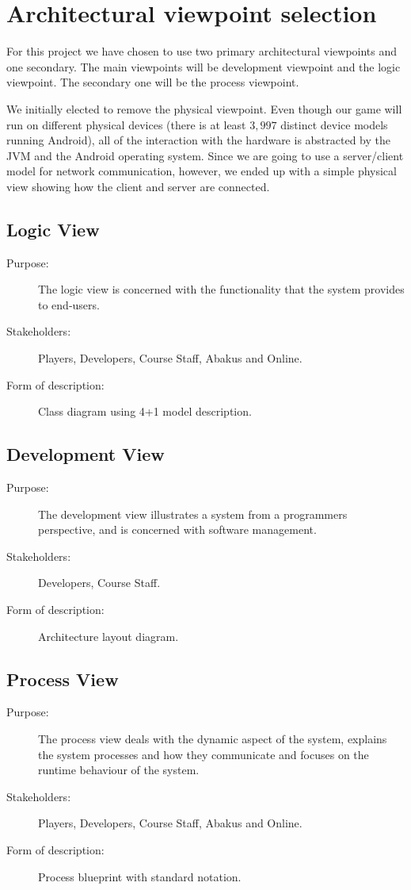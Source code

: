 \section{Architectural viewpoint selection}
\label{architecturalviewpointselection}
For this project we have chosen to use two primary architectural viewpoints and
one secondary. The main viewpoints will be development viewpoint and the logic
viewpoint. The secondary one will be the process viewpoint.

We initially elected to remove the physical viewpoint. Even though our game
will run on different physical devices (there is at least $3,997$ distinct
device models running Android\cite{website:androidfrag}), all of the
interaction with the hardware is abstracted by the JVM and the Android
operating system. Since we are going to use a server/client model for network
communication, however, we ended up with a simple physical view showing how
the client and server are connected.

\subsection{Logic View}
\begin{description}
	\item[Purpose:]{The logic view is concerned with the functionality that the
    system provides to end-users.}
	\item[Stakeholders:]{Players, Developers, Course Staff, Abakus and
    Online.}
	\item[Form of description:]{Class diagram using 4+1 model description.}
\end{description}

\subsection{Development View}
\begin{description}
	\item[Purpose:]{The development view illustrates a system from a programmers
    perspective, and is concerned with software management.}
	\item[Stakeholders:]{Developers, Course Staff.}
	\item[Form of description:]{Architecture layout diagram.}
\end{description}

\subsection{Process View}
\begin{description}
	\item[Purpose:]{The process view deals with the dynamic aspect of the system,
    explains the system processes and how they communicate and focuses on the
    runtime behaviour of the system.}
	\item[Stakeholders:]{Players, Developers, Course Staff, Abakus and Online.}
	\item[Form of description:]{Process blueprint with standard notation.}
\end{description}

